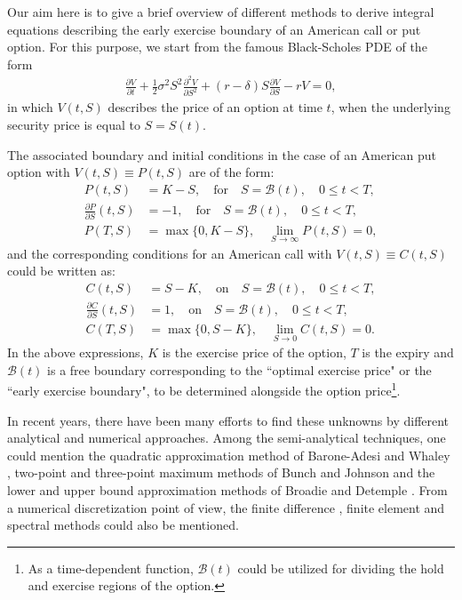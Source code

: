 \documentclass[fleqn,final,3p,11pt]{elsarticle}
\theoremstyle{definition}
\theoremstyle{remark}
\numberwithin{equation}{section}
\begin{document}
Our aim here is to give a brief overview of different methods to derive integral equations describing the early exercise boundary of an American call or put option. For this purpose, we start from the famous Black-Scholes PDE of the form
\begin{gather}\label{pde}
\frac{\partial V}{\partial t}+\frac{1}{2}\sigma^{2}S^{2}\frac{\partial^{2}V}{\partial S^{2}} +(r-\delta)S\frac{\partial V}{\partial S}-rV = 0,
\end{gather}
in which $V(t, S)$ describes the price of an option at time $t$, when the underlying security price is equal to $S = S(t)$.

The associated boundary and initial conditions in the case of an American put option with $V(t, S)\equiv P(t, S)$ are of the form:
\begin{align}\label{callcon}
P(t, S)&=K - S, \quad \text{for} \quad S = \mathcal{B}(t), \quad 0\leq t <T, \\\label{smoothcal}
\frac{\partial P}{\partial S}(t, S)&=-1,  \quad \text{for} \quad S = \mathcal{B}(t), \quad 0\leq t <T,\\
P(T, S)& = \max\{0, K-S \}, \quad
\lim_{S \rightarrow \infty} P(t, S) = 0,
\end{align}
and the corresponding conditions for an American call with $V(t, S)\equiv C(t, S)$ could be written as:
\begin{align}\label{putcon}
C(t, S)&=S - K, \quad \text{on} \quad S = \mathcal{B}(t), \quad 0\leq t <T, \\\label{smoothput1}
\frac{\partial C}{\partial S}(t, S)&=1,  \quad \text{on} \quad S = \mathcal{B}(t), \quad 0\leq t <T,\\
C(T, S)& = \max\{0, S - K \}, \quad \lim_{S \rightarrow 0} C(t, S) = 0.\label{tah}
\end{align}
In the above expressions, $K$ is the exercise price of the option, $T$ is the expiry and $\mathcal{B}(t)$ is a free boundary corresponding to the ``optimal exercise price" or the ``early exercise boundary", to be determined alongside the option price\footnote{As a time-dependent function, $\mathcal{B}(t)$ could be utilized for dividing the hold and exercise regions of the option.}.

In recent years, there have been many efforts to find these unknowns by different analytical and numerical approaches. Among the semi-analytical techniques, one could mention the quadratic approximation method of  Barone-Adesi and Whaley \cite{barron}, two-point and three-point maximum methods of Bunch and Johnson \cite{bunch1992simple} and the lower and upper bound approximation methods of Broadie and Detemple \cite{broadie1996american}. From a numerical discretization point of view,  the finite difference \cite{duffy}, finite element \cite{achdou} and  spectral methods \cite{chen2012new} could also be mentioned.
\end{document}
